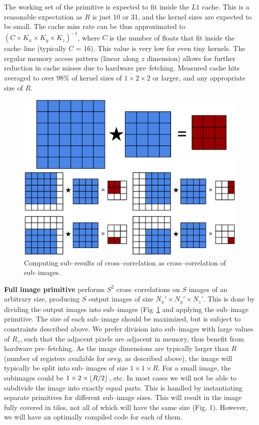   The working set of the primitive is expected to fit inside the $L1$
  cache.  This is a reasonable expectation as $R$ is just 10 or 31, and the kernel sizes are expected
  to be small.  The cache miss rate can be thus approximated to
  $(C \times K_x \times K_y \times K_z)^{-1}$, where $C$ is the
  number of floats that fit inside the cache--line (typically $C$ =
  16).  This value is very low for even tiny kernels.  The regular
  memory access pattern (linear along $z$ dimension) allows for
  further reduction in cache misses due to hardware pre--fetching.
  Measured cache hits averaged to over $98\%$ of kernel sizes of $1
  \times 2 \times 2$ or larger, and any appropriate size of $R$.

  \begin{figure}
    \begin{center}
      \includegraphics[width=0.57\linewidth]{fig/division}
    \end{center}
    \caption{Computing sub--results of cross--correlation as
      cross--correlation of sub--images.}
    \label{fig:conv-division}
  \end{figure}

  {\bf Full image primitive} performs $S^2$ cross--correlations on $S$ images
  of an arbitrary size, producing $S$ output images of size $N_x'
  \times N_y' \times N_z'$.  This is done by dividing the output
  images into sub--images (Fig~\ref{fig:conv-division} and applying
  the sub--image primitive.  The size of each sub--image should
  be maximized, but is subject to constraints described above.  We
  prefer division into sub--images with large values of $R_z$, such that the adjacent pixels are adjacent in
  memory, thus benefit from hardware pre--fetching.  As the image
  dimensions are typically larger than $R$ (number of registers
  available for $oreg$, as described above), the image
  will typically be split into sub--images of size $1 \times 1 \times R$.
  For a small image, the subimages could be $1 \times 2 \times
  \lfloor R/2\rfloor$, etc.  In most cases we will not be able to
  subdivide the image into exactly equal parts.  This is handled by
  instantiating separate primitives for different sub--image sizes.
  This will result in the image fully covered in tiles, not all of
  which will have the same size (Fig. 1).  However, we will have an optimally
  compiled code for each of them.

